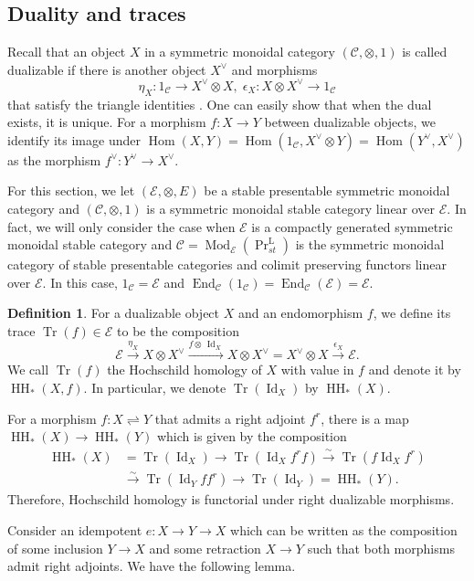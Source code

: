 \documentclass[11pt]{amsart}
\numberwithin{equation}{section}
\theoremstyle{plain}
\theoremstyle{definition}
\newtheorem{Def}[def]{Definition}
\theoremstyle{remark}
\newcommand{\cC} { {\mathcal{C}}}
\newcommand{\cE} { {\mathcal{E}}}
\newcommand{\Id}{{\operatorname{Id}}}
\newcommand{\Mod}{{\operatorname{Mod}}}
\newcommand\End{\operatorname{End}}
\newcommand\HH{\operatorname{HH}}
\newcommand\Tr{\operatorname{Tr}}
\newcommand\Hom{\operatorname{Hom}}
\newcommand\PrLst{  {  \operatorname{Pr}^{\operatorname{L} }_{st} } }
\begin{document}
\subsection{Duality and traces}
Recall that an object $X$ in a symmetric monoidal category $(\cC, \otimes, 1)$ is called dualizable if there is another object $X^\vee$ and morphisms
\[\eta_X: 1_\cC \to X^\vee \otimes X, \; \epsilon_X: X \otimes X^\vee \to 1_\cC\]
that satisfy the triangle identities \cite[Section 4.6]{HA} \cite[Section 2.1]{Hoyois-Scherotzke-Sibilla}. One can easily show that when the dual exists, it is unique.
For a morphism $f: X \to Y$ between dualizable objects, we identify its image under $\Hom(X, Y) = \Hom(1_\cC, X^\vee \otimes Y) = \Hom(Y^\vee, X^\vee)$ as the morphism $f^\vee: Y^\vee \to X^\vee$.

For this section, we let $(\cE, \otimes, E)$ be a stable presentable symmetric monoidal category and $(\cC, \otimes, 1)$ is a symmetric monoidal stable category linear over $\cE$.
In fact, we will only consider the case when $\cE$ is a compactly generated symmetric monoidal stable category and $\cC = \Mod_\cE(\PrLst)$ is the symmetric monoidal category of stable presentable categories and colimit preserving functors linear over $\cE$. In this case, $1_\cC = \cE$ and $\End_\cC(1_\cC) = \End_\cC(\cE) = \cE$.

\begin{Def}
For a dualizable object $X$ and an endomorphism $f$, 
we define its trace $\Tr(f) \in \cE$ to be the composition
\[\cE \xrightarrow{\eta_X} X \otimes X^\vee \xrightarrow{f \otimes \,\Id_X} X \otimes X^\vee = X^\vee \otimes X \xrightarrow{\epsilon_X} \cE.\]
We call $\Tr(f)$ the Hochschild homology of $X$ with value in $f$ and denote it by $\HH_*(X, f)$. In particular, we denote $\Tr(\Id_X)$ by $\HH_*(X)$.
\end{Def} 


For a morphism $f: X \rightleftharpoons Y$ that admits a right adjoint $f^r$, there is a map $\HH_*(X) \rightarrow \HH_*(Y)$ which is given by the composition \cite[Lemma~4.1]{Brav-Dyckerhoff2}
\begin{align*}
\HH_*(X) &=\Tr(\Id_X) \to \Tr(\Id_X f^rf) \xrightarrow{\sim} \Tr(f \Id_X f^r) \\
&\xrightarrow{\sim} \Tr(\Id_Y ff^r) \to \Tr(\Id_Y) = \HH_*(Y).
\end{align*}
Therefore, Hochschild homology is functorial under right dualizable morphisms.

Consider an idempotent $e: X \to Y \to X$ which can be written as the composition of some inclusion $Y \to X$ and some retraction $X \to Y$ such that both morphisms admit right adjoints. We have the following lemma.
\end{document}
